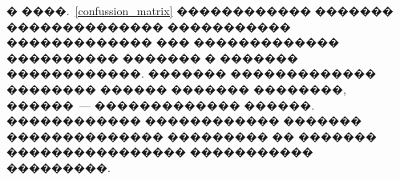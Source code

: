 \documentclass[12pt,twoside, notitlepage]{article}
\begin{document}
\begin{table}[!ht]
  \centering
  \caption{������� ��������������}
  \qquad
\label{confussion_matrix}
\end{table}

� ����.~\ref{confussion_matrix} ������������ ������� �������������� ����������� ������������� ��� �������������
���������� ������� � ������� ������������.
������� ������������� �������� ������ ������� ��������, ������~--- ������������� ������.
������������ ������������ ������� �������������� ��������� �� ������� ���������������� ����������� ���������.
\end{document}
